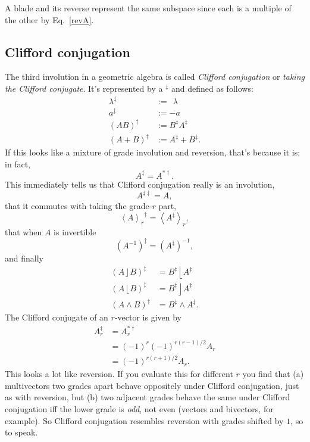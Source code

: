 \documentclass{utarticle}
\DeclareMathOperator{\lin}{\rfloor}
\DeclareMathOperator{\rin}{\lfloor}
\DeclareMathOperator{\out}{\wedge}
\newcommand{\grinvrev}[1]{\ensuremath{#1^{*\dagger}}}
\newcommand{\clifconj}[1]{\ensuremath{#1^\ddagger}}
\newcommand{\doubleclifconj}[1]{\ensuremath{#1^{\ddagger\ddagger}}}
\newcommand{\grade}[2][]{\ensuremath{\left\langle #2 \right\rangle_{#1}}}
\begin{document}
A blade and its reverse represent the same subspace since each is a multiple of the 
other by Eq.~\eqref{revA}.

\subsection{Clifford conjugation}
\label{cliffordconj}

The third involution in a geometric algebra is called \emph{Clifford conjugation} or 
\emph{taking the Clifford conjugate}.  It's represented by a \clifconj{} and defined as 
follows:
\begin{align}
\clifconj{\lambda} & := \ \ \lambda \nonumber \\
\clifconj{a} & := -a \nonumber \\
\clifconj{(AB)} & := \clifconj{B} \clifconj{A} \nonumber \\
\clifconj{(A + B)} & := \clifconj{A} + \clifconj{B}.
\label{clifconjrules} 
\end{align}
If this looks like a mixture of grade involution and reversion, that's because 
it is; in fact,
\begin{equation} \clifconj{A} = \grinvrev{A}. \end{equation}
This immediately tells us that Clifford conjugation really is an involution,
\begin{equation} \doubleclifconj{A} = A, \end{equation}
that it commutes with taking the grade-$r$ part,
\begin{equation} \clifconj{\grade[r]{A}} = \grade[r]{\clifconj{A}}, \end{equation}
that when $A$ is invertible
\begin{equation} \clifconj{(A^{-1})} = (\clifconj{A})^{-1}, \end{equation}
and finally
\begin{align}
\clifconj{(A \lin B)} & = \clifconj{B} \rin \clifconj{A} \nonumber \\
\clifconj{(A \rin B)} & = \clifconj{B} \lin \clifconj{A} \nonumber \\
\clifconj{(A \out B)} & = \clifconj{B} \out \clifconj{A}.
\end{align}
The Clifford conjugate of an $r$-vector is given by
\begin{align}
\clifconj{A_r} & = \grinvrev{A_r} \nonumber \\
  & = (-1)^r (-1)^{r(r-1)/2} A_r \nonumber \\
  & = (-1)^{r(r+1)/2} A_r.
\label{clifconjA}
\end{align}
This looks a lot like reversion.  If you evaluate this for different $r$ you find that
(a) multivectors two grades apart behave oppositely under Clifford conjugation, just
as with reversion, but (b) two adjacent grades behave the same under Clifford conjugation 
iff the lower grade is \emph{odd}, not even (vectors and bivectors, for example). 
So Clifford conjugation resembles reversion with grades shifted by $1$, so to speak.
\end{document}
